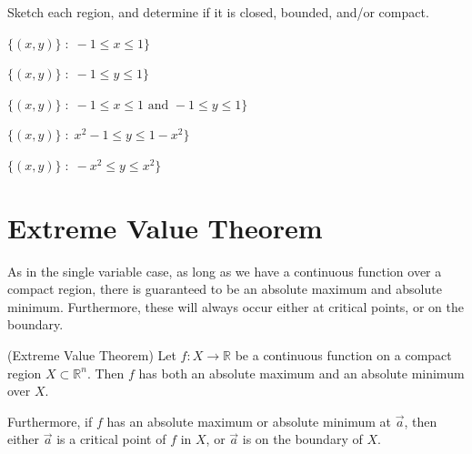 \documentclass{ximera}
\begin{document}
\begin{problem}
Sketch each region, and determine if it is closed, bounded, and/or compact.

$\{(x,y)\}\;:\;-1\leq x\leq 1\}$
\begin{selectAll}
\end{selectAll}

$\{(x,y)\}\;:\;-1\leq y\leq 1\}$
\begin{selectAll}
\end{selectAll}

$\{(x,y)\}\;:\;-1\leq x\leq 1\text{ and }-1\leq y\leq 1\}$
\begin{selectAll}
\end{selectAll}

$\{(x,y)\}\;:\;x^2-1\leq y\leq 1-x^2\}$
\begin{selectAll}
\end{selectAll}

$\{(x,y)\}\;:\;-x^2\leq y\leq x^2\}$
\begin{selectAll}
\end{selectAll}

\end{problem}

\section*{Extreme Value Theorem}

As in the single variable case, as long as we have a continuous function over a compact region, there is guaranteed to be an absolute maximum and absolute minimum. Furthermore, these will always occur either at critical points, or on the boundary.

\begin{theorem}
(Extreme Value Theorem) Let $f:X\rightarrow\mathbb{R}$ be a continuous function on a compact region $X\subset \mathbb{R}^n$. Then $f$ has both an absolute maximum and an absolute minimum over $X$.

 Furthermore, if $f$ has an absolute maximum or absolute minimum at $\vec{a}$, then either $\vec{a}$ is a critical point of $f$ in $X$, or $\vec{a}$ is on the boundary of $X$.
\end{theorem}
\end{document}
